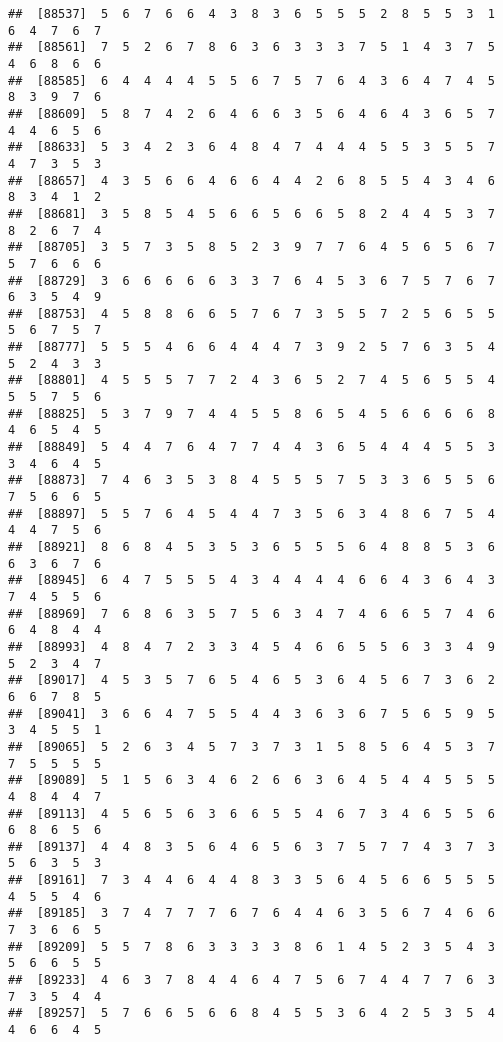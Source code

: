 \documentclass[
]{book}
\begin{document}
\begin{verbatim}
##  [88537]  5  6  7  6  6  4  3  8  3  6  5  5  5  2  8  5  5  3  1  6  4  7  6  7
##  [88561]  7  5  2  6  7  8  6  3  6  3  3  3  7  5  1  4  3  7  5  4  6  8  6  6
##  [88585]  6  4  4  4  4  5  5  6  7  5  7  6  4  3  6  4  7  4  5  8  3  9  7  6
##  [88609]  5  8  7  4  2  6  4  6  6  3  5  6  4  6  4  3  6  5  7  4  4  6  5  6
##  [88633]  5  3  4  2  3  6  4  8  4  7  4  4  4  5  5  3  5  5  7  4  7  3  5  3
##  [88657]  4  3  5  6  6  4  6  6  4  4  2  6  8  5  5  4  3  4  6  8  3  4  1  2
##  [88681]  3  5  8  5  4  5  6  6  5  6  6  5  8  2  4  4  5  3  7  8  2  6  7  4
##  [88705]  3  5  7  3  5  8  5  2  3  9  7  7  6  4  5  6  5  6  7  5  7  6  6  6
##  [88729]  3  6  6  6  6  6  3  3  7  6  4  5  3  6  7  5  7  6  7  6  3  5  4  9
##  [88753]  4  5  8  8  6  6  5  7  6  7  3  5  5  7  2  5  6  5  5  5  6  7  5  7
##  [88777]  5  5  5  4  6  6  4  4  4  7  3  9  2  5  7  6  3  5  4  5  2  4  3  3
##  [88801]  4  5  5  5  7  7  2  4  3  6  5  2  7  4  5  6  5  5  4  5  5  7  5  6
##  [88825]  5  3  7  9  7  4  4  5  5  8  6  5  4  5  6  6  6  6  8  4  6  5  4  5
##  [88849]  5  4  4  7  6  4  7  7  4  4  3  6  5  4  4  4  5  5  3  3  4  6  4  5
##  [88873]  7  4  6  3  5  3  8  4  5  5  5  7  5  3  3  6  5  5  6  7  5  6  6  5
##  [88897]  5  5  7  6  4  5  4  4  7  3  5  6  3  4  8  6  7  5  4  4  4  7  5  6
##  [88921]  8  6  8  4  5  3  5  3  6  5  5  5  6  4  8  8  5  3  6  6  3  6  7  6
##  [88945]  6  4  7  5  5  5  4  3  4  4  4  4  6  6  4  3  6  4  3  7  4  5  5  6
##  [88969]  7  6  8  6  3  5  7  5  6  3  4  7  4  6  6  5  7  4  6  6  4  8  4  4
##  [88993]  4  8  4  7  2  3  3  4  5  4  6  6  5  5  6  3  3  4  9  5  2  3  4  7
##  [89017]  4  5  3  5  7  6  5  4  6  5  3  6  4  5  6  7  3  6  2  6  6  7  8  5
##  [89041]  3  6  6  4  7  5  5  4  4  3  6  3  6  7  5  6  5  9  5  3  4  5  5  1
##  [89065]  5  2  6  3  4  5  7  3  7  3  1  5  8  5  6  4  5  3  7  7  5  5  5  5
##  [89089]  5  1  5  6  3  4  6  2  6  6  3  6  4  5  4  4  5  5  5  4  8  4  4  7
##  [89113]  4  5  6  5  6  3  6  6  5  5  4  6  7  3  4  6  5  5  6  6  8  6  5  6
##  [89137]  4  4  8  3  5  6  4  6  5  6  3  7  5  7  7  4  3  7  3  5  6  3  5  3
##  [89161]  7  3  4  4  6  4  4  8  3  3  5  6  4  5  6  6  5  5  5  4  5  5  4  6
##  [89185]  3  7  4  7  7  7  6  7  6  4  4  6  3  5  6  7  4  6  6  7  3  6  6  5
##  [89209]  5  5  7  8  6  3  3  3  3  8  6  1  4  5  2  3  5  4  3  5  6  6  5  5
##  [89233]  4  6  3  7  8  4  4  6  4  7  5  6  7  4  4  7  7  6  3  7  3  5  4  4
##  [89257]  5  7  6  6  5  6  6  8  4  5  5  3  6  4  2  5  3  5  4  4  6  6  4  5

\end{verbatim}
\end{document}

